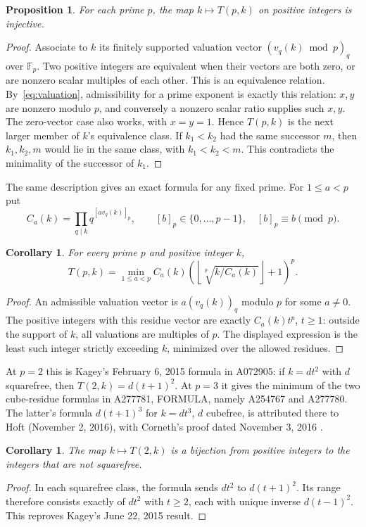 \documentclass[11pt]{article}
\newtheorem{proposition}[theorem]{Proposition}
\newtheorem{corollary}[theorem]{Corollary}
\begin{document}
\begin{proposition}\label{prop:distinct}
For each prime $p$, the map $k\mapsto T(p,k)$ on positive integers
is injective.
\end{proposition}
\begin{proof}
Associate to $k$ its finitely supported valuation vector
$(v_q(k)\bmod p)_q$ over $\mathbb F_p$.
Two positive integers are equivalent when their vectors are both zero,
or are nonzero scalar multiples of each other.
This is an equivalence relation. By~\eqref{eq:valuation}, admissibility
for a prime exponent is exactly this relation: $x,y$ are nonzero modulo $p$,
and conversely a nonzero scalar ratio supplies such $x,y$.
The zero-vector case also works, with $x=y=1$.
Hence $T(p,k)$ is the next larger member of $k$'s equivalence class.
If $k_1<k_2$ had the same successor $m$, then $k_1,k_2,m$ would lie
in the same class, with $k_1<k_2<m$. This contradicts the minimality
of the successor of $k_1$.
\end{proof}

The same description gives an exact formula for any fixed prime.
For $1\le a<p$ put
\[
 C_a(k)=\prod_{q\mid k}q^{[a v_q(k)]_p},
 \qquad [b]_p\in\{0,\ldots,p-1\},\quad [b]_p\equiv b\pmod p.
\]
\begin{corollary}\label{cor:primeformula}
For every prime $p$ and positive integer $k$,
\[
 T(p,k)=\min_{1\le a<p} C_a(k)
 \left(\left\lfloor\sqrt[p]{k/C_a(k)}\right\rfloor+1\right)^p.
\]
\end{corollary}
\begin{proof}
An admissible valuation vector is $a(v_q(k))_q$ modulo $p$ for
some $a\ne0$. The positive integers with this residue vector are exactly
$C_a(k)t^p$, $t\ge1$: outside the support of $k$, all valuations are
multiples of $p$. The displayed expression is the least such integer
strictly exceeding $k$, minimized over the allowed residues.
\end{proof}
At $p=2$ this is Kagey's February 6, 2015 formula in A072905:
if $k=d t^2$ with $d$ squarefree, then $T(2,k)=d(t+1)^2$.
At $p=3$ it gives the minimum of the two cube-residue formulas in
A277781, FORMULA, namely A254767 and A277780. The latter's formula
$d(t+1)^3$ for $k=dt^3$, $d$ cubefree, is attributed there to
Hoft (November 2, 2016), with Corneth's proof dated November 3, 2016
\cite{a277780}.

\begin{corollary}\label{cor:squarerange}
The map $k\mapsto T(2,k)$ is a bijection from positive integers to
the integers that are not squarefree.
\end{corollary}
\begin{proof}
In each squarefree class, the formula sends $dt^2$ to $d(t+1)^2$.
Its range therefore consists exactly of $dt^2$ with $t\ge2$, each with
unique inverse $d(t-1)^2$. This reproves Kagey's June 22, 2015 result.
\end{proof}
\end{document}
